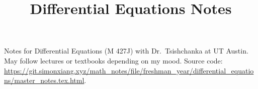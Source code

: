 \documentclass[fontsize=9pt]{scrartcl}
\title{Differential Equations Notes}
\date{}
\begin{document}
\maketitle
Notes for Differential Equations (M 427J) with Dr.\ Tsishchanka at UT Austin. May follow lectures or textbooks depending on my mood. Source code: \url{https://git.simonxiang.xyz/math_notes/file/freshman_year/differential_equations/master_notes.tex.html}.
\tableofcontents 
    
\end{document}
